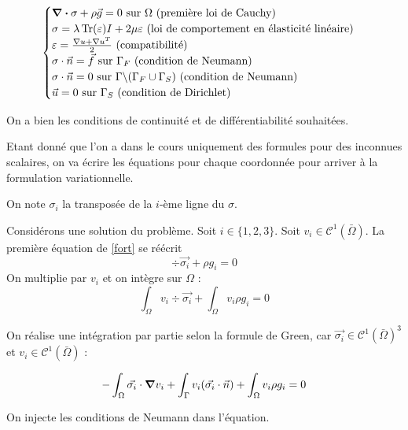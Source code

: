 \begin{equation}\label{fort}
    \begin{cases}
      \div \sigma + \rho \vec{g} = 0 \textrm { sur $\Omega$ (première loi de Cauchy)} \\
      \sigma = \lambda \operatorname{Tr} (\varepsilon) I + 2 \mu \varepsilon \textrm { (loi de comportement en élasticité linéaire)} \\
      \varepsilon=\frac{\nabla u + \nabla u^T }{2} \textrm { (compatibilité)} \\
      \sigma \cdot \vec{n} = \vec{f}\textrm { sur $\Gamma_F$ (condition de Neumann)} \\
      \sigma \cdot \vec{n} = 0\textrm { sur $\Gamma \backslash (\Gamma_F \cup \Gamma_S) $ (condition de Neumann)} \\
      \vec{u} = 0 \textrm { sur $\Gamma_S$ (condition de Dirichlet)} \\
      
    \end{cases}
\end{equation}

On a bien les conditions de continuité et de différentiabilité souhaitées. %

Etant donné que l'on a dans le cours uniquement des formules pour des inconnues scalaires, on va écrire les équations pour chaque coordonnée pour arriver à la formulation variationnelle.

On note $\sigma_i$ la transposée de la $i$-ème ligne du $\sigma$.

Considérons une solution du problème.
Soit $i \in \{1,2,3\}$.
Soit $v_i \in \mathcal{C}^1(\bar{\Omega})$.
La première équation de \eqref{fort} se réécrit 
$$\div \vec{\sigma_i} + \rho g_i = 0$$
On multiplie par $v_i$ et on intègre sur $\Omega$ :
$$\int_\Omega v_i \div \vec{\sigma_i} +  \int_\Omega v_i \rho g_i = 0$$

On réalise une intégration par partie selon la formule de Green, car $\vec{\sigma_i} \in \mathcal{C}^1(\bar{\Omega})^3$ et $v_i \in \mathcal{C}^1(\bar{\Omega})$ :

$$-\int_{\Omega} \vec{\sigma_i} \cdot \grad v_i + \int_{\Gamma} v_i (\vec{\sigma_i} \cdot \vec{n}) + \int_\Omega v_i \rho g_i = 0$$

On injecte les conditions de Neumann dans l'équation. %



    

